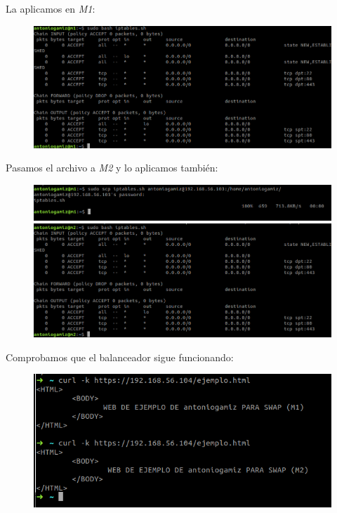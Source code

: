 \documentclass[12pt]{article}
\begin{document}
La aplicamos en \textit{M1}:

\begin{figure}[H]
\center
\includegraphics[scale=0.3,width=\textwidth]{17.png}
\end{figure}

Pasamos el archivo a \textit{M2} y lo aplicamos también:

\begin{figure}[H]
\center
\includegraphics[scale=0.5,width=\textwidth]{19.png}
\includegraphics[scale=0.5,width=\textwidth]{20.png}
\end{figure}

Comprobamos que el balanceador sigue funcionando:

\begin{figure}[H]
\center
\includegraphics[scale=0.5,width=\textwidth]{21.png}
\end{figure}
\end{document}
